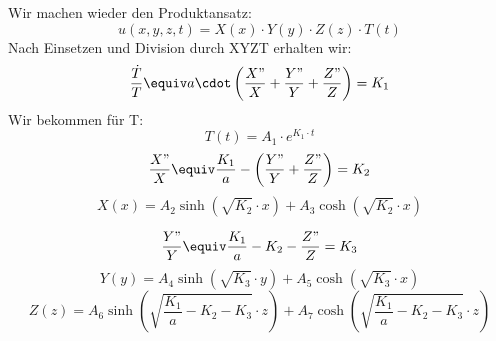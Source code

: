 \documentclass[
	11pt, %
]{beamer}
\begin{document}
\begin{frame}
	\begin{exampleblock}{}
Wir machen wieder den Produktansatz:
		\begin{equation}
			u(x,y,z,t)=X(x)\cdot Y(y)\cdot Z(z)\cdot T(t)
		\end{equation}
		Nach Einsetzen und Division durch XYZT erhalten wir:
		\begin{equation}
			\frac{\dot{T}}{T} \equiv a\cdot\left(\frac{X"}{X}+\frac{Y"}{Y}+\frac{Z"}{Z}\right)=K_1
		\end{equation}
		Wir bekommen f\"ur T:
		\begin{equation}
			T(t)=A_1\cdot e^{K_1\cdot t}
		\end{equation}
		\begin{equation}
			\frac{X"}{X}\equiv \frac{K_1}{a}-\left(\frac{Y"}{Y}+\frac{Z"}{Z}\right)=K_2
		\end{equation}
		\begin{equation}
			X(x)=A_2\sinh\left(\sqrt{K_2}\cdot x\right)+A_3\cosh\left(\sqrt{K_2}\cdot x\right)
		\end{equation}
	\end{exampleblock}
\end{frame}
\begin{frame}
	\begin{exampleblock}{}
		\begin{equation}
			\frac{Y"}{Y}\equiv \frac{K_1}{a}-K_2-\frac{Z"}{Z}=K_3
		\end{equation}
		\begin{equation}
			Y(y)=A_4\sinh\left(\sqrt{K_3}\cdot y\right)+A_5\cosh\left(\sqrt{K_3}\cdot x\right)
		\end{equation}
		\begin{equation}
			Z(z)=A_6\sinh\left(\sqrt{\frac{K_1}{a}-K_2-K_3}\cdot z\right)+A_7\cosh\left(\sqrt{\frac{K_1}{a}-K_2-K_3}\cdot z\right)
		\end{equation}
	\end{exampleblock}
\end{frame}
\end{document}
